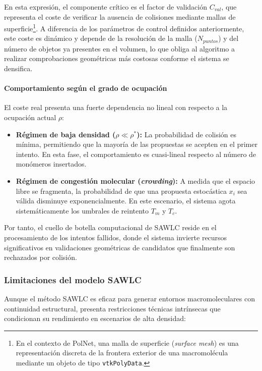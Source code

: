 En esta expresión, el componente crítico es el factor de validación $C_{val}$, que representa el coste de verificar la ausencia de colisiones mediante {mallas de superficie}\footnote{En el contexto de PolNet, una malla de superficie (\textit{surface mesh}) es una representación discreta de la frontera exterior de una macromolécula mediante un objeto de tipo \texttt{vtkPolyData}.}. A diferencia de los parámetros de control definidos anteriormente, este coste es dinámico y depende de la resolución de la malla ($N_{puntos}$) y del número de objetos ya presentes en el volumen, lo que obliga al algoritmo a realizar comprobaciones geométricas más costosas conforme el sistema se densifica.

\paragraph{Comportamiento según el grado de ocupación}

El coste real presenta una fuerte dependencia no lineal con respecto a la ocupación actual $\rho$:

\begin{itemize}
    \item \textbf{Régimen de baja densidad ($\rho \ll \rho^*$):} La probabilidad de colisión es mínima, permitiendo que la mayoría de las propuestas se acepten en el primer intento. En esta fase, el comportamiento es cuasi-lineal respecto al número de monómeros insertados.
    \item \textbf{Régimen de congestión molecular (\textit{crowding}):} A medida que el espacio libre se fragmenta, la probabilidad de que una propuesta estocástica $x_i$ sea válida disminuye exponencialmente. En este escenario, el sistema agota sistemáticamente los umbrales de reintento $T_m$ y $T_c$.
\end{itemize}

Por tanto, el cuello de botella computacional de SAWLC reside en el procesamiento de los intentos fallidos, donde el sistema invierte recursos significativos en validaciones geométricas de candidatos que finalmente son rechazados por colisión.

\subsubsection{Limitaciones del modelo SAWLC}

Aunque el método SAWLC es eficaz para generar entornos macromoleculares con continuidad estructural, presenta restricciones técnicas intrínsecas que condicionan su rendimiento en escenarios de alta densidad:

